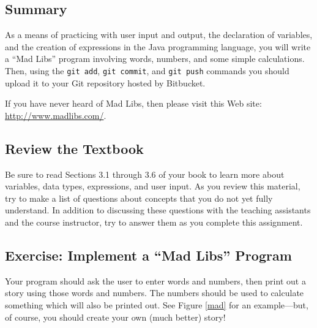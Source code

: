


\vspace*{-.2in}
\subsection*{Summary}
\vspace*{-.05in}

As a means of practicing with user input and output, the declaration of variables, and the creation of expressions in
the Java programming language, you will write a ``Mad Libs'' program involving words, numbers, and some simple
calculations.  Then, using the {\tt git add}, {\tt git commit}, and {\tt git push} commands you should upload it to your
Git repository hosted by Bitbucket.

\noindent
If you have never heard of Mad Libs, then please visit this Web site: \url{http://www.madlibs.com/}.

\vspace*{-.15in}
\subsection*{Review the Textbook}
\vspace*{-.05in}
Be sure to read Sections 3.1 through 3.6 of your book to learn more about variables, data types, expressions, and user
input.  As you review this material, try to make a list of questions about concepts that you do not yet fully
understand.  In addition to discussing these questions with the teaching assistants and the course instructor, try to
answer them as you complete this assignment.

\vspace*{-.15in}
\subsection*{Exercise: Implement a ``Mad Libs'' Program}
\vspace*{-.05in}
Your program should ask the user to enter words and numbers, then print out a story using those words and numbers. The
numbers should be used to calculate something which will also be printed out. See Figure \ref{mad} for an example---but,
of course, you should create your own (much better) story!

